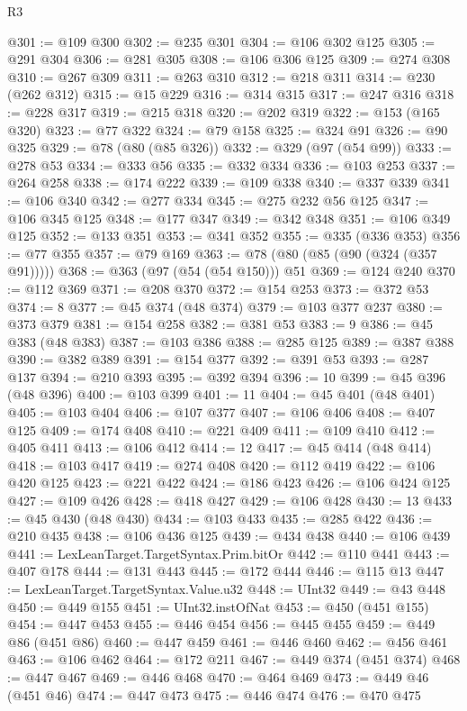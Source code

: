 \begin{lexlean}{R3}
\begin{coremodule}
@301 := @109 @300
@302 := @235 @301
@304 := @106 @302 @125
@305 := @291 @304
@306 := @281 @305
@308 := @106 @306 @125
@309 := @274 @308
@310 := @267 @309
@311 := @263 @310
@312 := @218 @311
@314 := @230 (@262 @312)
@315 := @15 @229
@316 := @314 @315
@317 := @247 @316
@318 := @228 @317
@319 := @215 @318
@320 := @202 @319
@322 := @153 (@165 @320)
@323 := @77 @322
@324 := @79 @158
@325 := @324 @91
@326 := @90 @325
@329 := @78 (@80 (@85 @326))
@332 := @329 (@97 (@54 @99))
@333 := @278 @53
@334 := @333 @56
@335 := @332 @334
@336 := @103 @253
@337 := @264 @258
@338 := @174 @222
@339 := @109 @338
@340 := @337 @339
@341 := @106 @340
@342 := @277 @334
@345 := @275 @232 @56 @125
@347 := @106 @345 @125
@348 := @177 @347
@349 := @342 @348
@351 := @106 @349 @125
@352 := @133 @351
@353 := @341 @352
@355 := @335 (@336 @353)
@356 := @77 @355
@357 := @79 @169
@363 := @78 (@80 (@85 (@90 (@324 (@357 @91)))))
@368 := @363 (@97 (@54 (@54 @150))) @51
@369 := @124 @240
@370 := @112 @369
@371 := @208 @370
@372 := @154 @253
@373 := @372 @53
@374 := 8
@377 := @45 @374 (@48 @374)
@379 := @103 @377 @237
@380 := @373 @379
@381 := @154 @258
@382 := @381 @53
@383 := 9
@386 := @45 @383 (@48 @383)
@387 := @103 @386
@388 := @285 @125
@389 := @387 @388
@390 := @382 @389
@391 := @154 @377
@392 := @391 @53
@393 := @287 @137
@394 := @210 @393
@395 := @392 @394
@396 := 10
@399 := @45 @396 (@48 @396)
@400 := @103 @399
@401 := 11
@404 := @45 @401 (@48 @401)
@405 := @103 @404
@406 := @107 @377
@407 := @106 @406
@408 := @407 @125
@409 := @174 @408
@410 := @221 @409
@411 := @109 @410
@412 := @405 @411
@413 := @106 @412
@414 := 12
@417 := @45 @414 (@48 @414)
@418 := @103 @417
@419 := @274 @408
@420 := @112 @419
@422 := @106 @420 @125
@423 := @221 @422
@424 := @186 @423
@426 := @106 @424 @125
@427 := @109 @426
@428 := @418 @427
@429 := @106 @428
@430 := 13
@433 := @45 @430 (@48 @430)
@434 := @103 @433
@435 := @285 @422
@436 := @210 @435
@438 := @106 @436 @125
@439 := @434 @438
@440 := @106 @439
@441 := LexLeanTarget.TargetSyntax.Prim.bitOr
@442 := @110 @441
@443 := @407 @178
@444 := @131 @443
@445 := @172 @444
@446 := @115 @13
@447 := LexLeanTarget.TargetSyntax.Value.u32
@448 := UInt32
@449 := @43 @448
@450 := @449 @155
@451 := UInt32.instOfNat
@453 := @450 (@451 @155)
@454 := @447 @453
@455 := @446 @454
@456 := @445 @455
@459 := @449 @86 (@451 @86)
@460 := @447 @459
@461 := @446 @460
@462 := @456 @461
@463 := @106 @462
@464 := @172 @211
@467 := @449 @374 (@451 @374)
@468 := @447 @467
@469 := @446 @468
@470 := @464 @469
@473 := @449 @46 (@451 @46)
@474 := @447 @473
@475 := @446 @474
@476 := @470 @475

\end{coremodule}
\end{lexlean}
